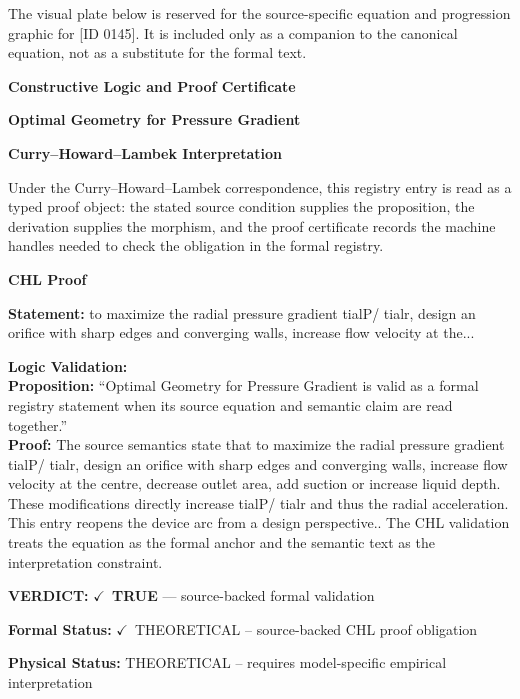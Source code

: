 \begingroup\footnotesize\sloppy
The visual plate below is reserved for the source-specific equation and progression graphic for [ID 0145]. It is included only as a companion to the canonical equation, not as a substitute for the formal text.
\par\endgroup
\ifTZPDarkEdition
{}
\fi

\clearpage
\begingroup\tzpsupportsetup
\noindent\textbf{\fontsize{10.8pt}{12.8pt}\selectfont [ID 0145] Constructive Logic and Proof Certificate}\par
\noindent\textbf{\fontsize{10pt}{12pt}\selectfont Optimal Geometry for Pressure Gradient}\par
\vspace{0.45em}
\begingroup
\footnotesize
\setlength{\parskip}{0.22em}
\setlength{\parindent}{0pt}
\noindent\textbf{Curry--Howard--Lambek Interpretation}\par
Under the Curry--Howard--Lambek correspondence, this registry entry is read as a typed proof
object: the stated source condition supplies the proposition, the derivation supplies the
morphism, and the proof certificate records the machine handles needed to check the obligation
in the formal registry.

\vspace{0.45em}
\noindent\textbf{CHL Proof}\par
\textbf{Statement:} to maximize the radial pressure gradient  tialP/ tialr, design an orifice with sharp
edges and converging walls, increase flow velocity at the...

\textbf{Logic Validation:}\\
\textbf{Proposition:} ``Optimal Geometry for Pressure Gradient is valid as a formal registry statement when its
source equation and semantic claim are read together.''\\
\textbf{Proof:} The source semantics state that to maximize the radial pressure gradient  tialP/
tialr, design an orifice with sharp edges and converging walls, increase flow velocity
at the centre, decrease outlet area, add suction or increase liquid depth. These
modifications directly increase  tialP/ tialr and thus the radial acceleration. This
entry reopens the device arc from a design perspective.. The CHL validation treats the
equation as the formal anchor and the semantic text as the interpretation constraint.

\textbf{VERDICT:} \ensuremath{\checkmark}\ \textbf{TRUE} --- source-backed formal validation

\textbf{Formal Status:} \ensuremath{\checkmark}\ THEORETICAL -- source-backed CHL proof obligation

\textbf{Physical Status:} THEORETICAL -- requires model-specific empirical interpretation
\par\vspace{0.45em}
\par
\ifTZPDarkEdition
{}
\fi
\endgroup
\endgroup
